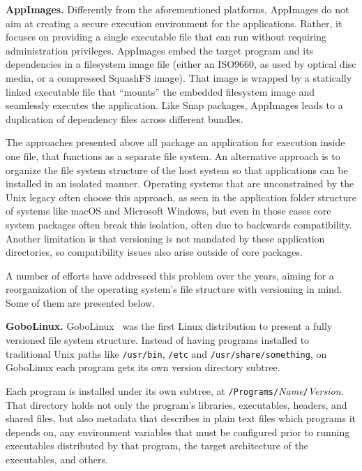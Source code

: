 \documentclass[sigplan, anonymous, 10pt]{acmart}
\begin{document}
\textbf{AppImages.}
Differently from the aforementioned platforms, AppImages do not aim at creating a
secure execution environment for the applications. Rather, it focuses on providing
a single executable file that can run without requiring administration privileges.
AppImages embed the target program and its dependencies in a filesystem image file
(either an ISO9660, as used by optical disc media, or a compressed SquashFS image).
That image is wrapped by a statically linked executable file that ``mounts'' the
embedded filesystem image and seamlessly executes the application. Like Snap
packages, AppImages leads to a duplication of dependency files across different
bundles.

The approaches presented above all package an application for execution inside one file,
that functions as a separate file system. An alternative approach is to organize the
file system structure of the host system so that applications can be installed in an
isolated manner. Operating systems that are unconstrained by the Unix legacy often
choose this approach, as seen in the application folder structure of systems like
macOS and Microsoft Windows, but even in those cases core system packages often
break this isolation, often due to backwards compatibility. Another limitation is that
versioning is not mandated by these application directories, so compatibility issues
also arise outside of core packages.

A number of efforts have addressed this problem over the years, aiming for a reorganization
of the operating system's file structure with versioning in mind. Some of them are presented below.

\textbf{GoboLinux.}
GoboLinux~\cite{muhammad2002:wsl} was the first Linux distribution to present a fully versioned
file system structure. Instead of having programs installed to traditional Unix paths
like \texttt{/usr/bin}, \texttt{/etc} and \texttt{/usr/share/something}, on GoboLinux
each program gets its own version directory subtree.

Each program is installed under its own subtree, at \texttt{/Pro\-grams/}\textit{Name}\texttt{/}\textit{Version}. That directory holds not
only the program's libraries, executables, headers, and shared files, but also metadata
that describes in plain text files which programs it depends on,
any environment variables that must be configured prior to running executables distributed
by that program, the target architecture of the executables, and others.
\end{document}
